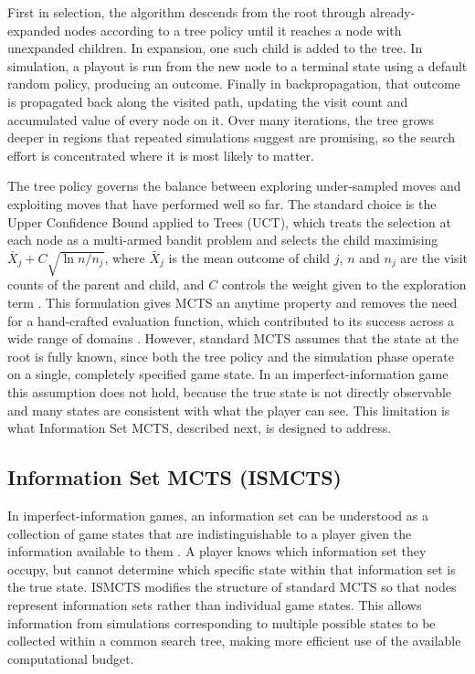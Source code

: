 \documentclass[12pt,a4paper,oneside]{report}
\begin{document}
First in selection, the algorithm descends from the root through already-expanded nodes according to a tree policy until it reaches a node with unexpanded children. In expansion, one such child is added to the tree. In simulation, a playout is run from the new node to a terminal state using a default random policy, producing an outcome. Finally in backpropagation, that outcome is propagated back along the visited path, updating the visit count and accumulated value of every node on it. Over many iterations, the tree grows deeper in regions that repeated simulations suggest are promising, so the search effort is concentrated where it is most likely to matter.

The tree policy governs the balance between exploring under-sampled moves and
exploiting moves that have performed well so far. The standard choice is the Upper
Confidence Bound applied to Trees (UCT), which treats the selection at each node as a
multi-armed bandit problem and selects the child maximising
$\bar{X}_j + C\sqrt{\ln n / n_j}$, where $\bar{X}_j$ is the mean outcome of child $j$,
$n$ and $n_j$ are the visit counts of the parent and child, and $C$ controls the
weight given to the exploration term \parencite{kocsis2006bandit}. This formulation gives
MCTS an anytime property and removes the need for a hand-crafted evaluation function,
which contributed to its success across a wide range of domains
\parencite{browne2012survey}. However, standard MCTS assumes that the state at the root is
fully known, since both the tree policy and the simulation phase operate on a single,
completely specified game state. In an imperfect-information game this assumption does
not hold, because the true state is not directly observable and many states are
consistent with what the player can see. This limitation is what Information Set MCTS,
described next, is designed to address.

\subsection{Information Set MCTS (ISMCTS)}

In imperfect-information games, an information set can be understood as a collection of game states that are indistinguishable to a player given the information available to them \parencite{cowling2012ismcts}. A player knows which information set they occupy, but cannot determine which specific state within that information set is the true state. ISMCTS modifies the structure of standard MCTS so that nodes represent information sets rather than individual game states. This allows information from simulations corresponding to multiple possible states to be collected within a common search tree, making more efficient use of the available computational budget.
\end{document}
